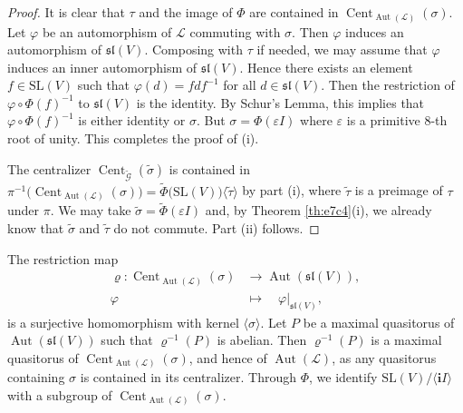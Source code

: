 \documentclass[a4paper,reqno]{amsart}
\theoremstyle{definition}
\numberwithin{theorem}{section}
\numberwithin{equation}{section}
\begin{document}
\begin{proof}
It is clear that $\tau$ and the image of $\Phi$ are contained in $\operatorname{\mathrm{Cent}}_{\operatorname{\mathrm{Aut}}({\mathcal{L}})}(\sigma)$. Let $\varphi$ be an automorphism of ${\mathcal{L}}$ commuting with $\sigma$. Then $\varphi$ induces an automorphism of ${{\mathfrak{sl}}}(V)$. Composing with $\tau$ if needed, we may assume that $\varphi$ induces an inner automorphism of ${{\mathfrak{sl}}}(V)$. Hence there exists an element $f\in{\mathrm{SL}}(V)$ such that $\varphi(d)=fdf^{-1}$ for all $d\in{{\mathfrak{sl}}}(V)$. Then the restriction of $\varphi\circ\Phi(f)^{-1}$ to ${{\mathfrak{sl}}}(V)$ is the identity. By Schur's Lemma, this implies that $\varphi\circ\Phi(f)^{-1}$ is either identity or $\sigma$. But $\sigma=\Phi({\varepsilon} I)$ where ${\varepsilon}$ is a primitive $8$-th root of unity. This completes the proof of (i).

The centralizer $\operatorname{\mathrm{Cent}}_{\tilde{\mathcal{G}}}(\tilde\sigma)$ is contained in $\pi^{-1}\bigl(\operatorname{\mathrm{Cent}}_{\operatorname{\mathrm{Aut}}({\mathcal{L}})}(\sigma)\bigr)=\tilde{\Phi}\bigl({\mathrm{SL}}(V)\bigr)\langle\tilde\tau\rangle$ by part (i), where $\tilde\tau$ is a preimage of $\tau$ under $\pi$. We may take $\tilde\sigma=\tilde\Phi({\varepsilon} I)$ and, by Theorem \ref{th:e7c4}(i), we already know that $\tilde\sigma$ and $\tilde\tau$ do not commute. Part (ii) follows.
\end{proof}

The restriction map
\[
\begin{split}
\varrho: \operatorname{\mathrm{Cent}}_{\operatorname{\mathrm{Aut}}({\mathcal{L}})}(\sigma)&\longrightarrow \operatorname{\mathrm{Aut}}({{\mathfrak{sl}}}(V)),\\
       \varphi\quad &\mapsto\quad \varphi\vert_{{{\mathfrak{sl}}}(V)},
\end{split}
\]
is a surjective homomorphism with kernel $\langle\sigma\rangle$. Let $P$ be a maximal quasitorus of $\operatorname{\mathrm{Aut}}({{\mathfrak{sl}}}(V))$ such that $\varrho^{-1}(P)$ is abelian. Then $\varrho^{-1}(P)$ is a maximal quasitorus of $\operatorname{\mathrm{Cent}}_{\operatorname{\mathrm{Aut}}({\mathcal{L}})}(\sigma)$, and hence of $\operatorname{\mathrm{Aut}}({\mathcal{L}})$, as any quasitorus containing $\sigma$ is contained in its centralizer. Through $\Phi$, we identify ${\mathrm{SL}}(V)/\langle {\mathbf{i}} I\rangle$ with a subgroup of $\operatorname{\mathrm{Cent}}_{\operatorname{\mathrm{Aut}}({\mathcal{L}})}(\sigma)$.
\end{document}

